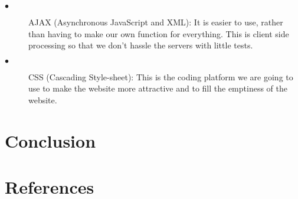 \documentclass[12pt]{article}
\begin{document}
\begin{description}
  \item[$\bullet$] AJAX (Asynchronous JavaScript and XML):
  It is easier to use, rather than having to make our own function for everything. This is client side processing so that we don’t hassle the servers with little tests.
  
  \item[$\bullet$] CSS (Cascading Style-sheet):
  This is the coding platform we are going to use to make the website more attractive and to fill the emptiness of the website.
\end{description}

\section{Conclusion}

\section{References}
\end{document}
